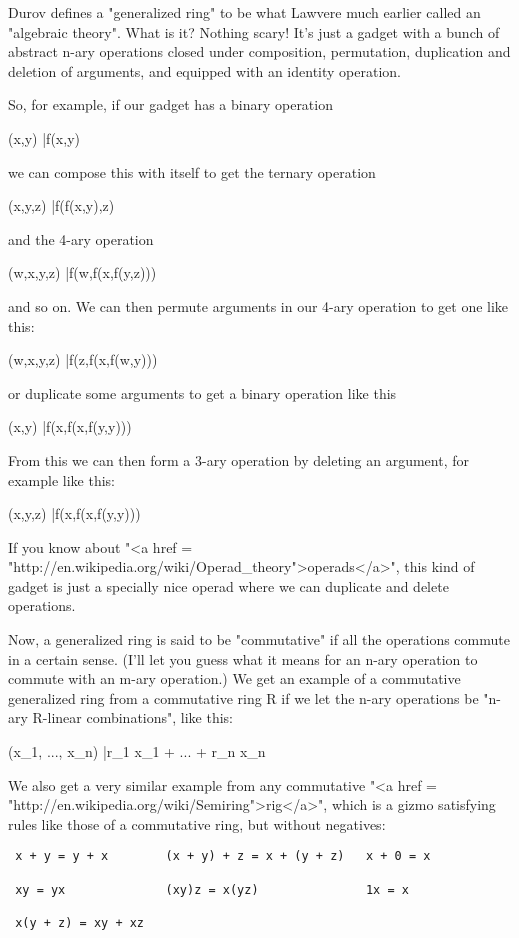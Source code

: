 Durov defines a "generalized ring" to be what Lawvere much
earlier called an "algebraic theory".  What is it?  Nothing
scary!  It's just a gadget with a bunch of abstract n-ary operations
closed under composition, permutation, duplication and deletion of
arguments, and equipped with an identity operation.

So, for example, if our gadget has a binary operation 

(x,y) |\to  f(x,y)

we can compose this with itself to get the ternary operation

(x,y,z) |\to  f(f(x,y),z)

and the 4-ary operation

(w,x,y,z) |\to  f(w,f(x,f(y,z)))

and so on.  We can then permute arguments in our 4-ary operation
to get one like this:

(w,x,y,z) |\to  f(z,f(x,f(w,y)))

or duplicate some arguments to get a binary operation like this

(x,y) |\to  f(x,f(x,f(y,y)))

From this we can then form a 3-ary operation by deleting an argument,
for example like this:

(x,y,z) |\to  f(x,f(x,f(y,y)))

If you know about 
"<a href = "http://en.wikipedia.org/wiki/Operad_theory">operads</a>",
this kind of gadget is just a specially 
nice operad where we can duplicate and delete operations.  
 
Now, a generalized ring is said to be "commutative" if all the 
operations commute in a certain sense.  (I'll let you guess what
it means for an n-ary operation to commute with an m-ary operation.)
We get an example of a commutative generalized ring from a commutative 
ring R if we let the n-ary operations be "n-ary R-linear 
combinations", like this:

(x_{1}, ..., x_{n}) |\to  r_{1} x_{1} + 
... + r_{n} x_{n}           

We also get a very similar example from any commutative "<a href =
"http://en.wikipedia.org/wiki/Semiring">rig</a>",
which is a gizmo satisfying rules like those of a commutative ring,
but without negatives:

\begin{verbatim}
 x + y = y + x        (x + y) + z = x + (y + z)   x + 0 = x

 xy = yx              (xy)z = x(yz)               1x = x

 x(y + z) = xy + xz 
\end{verbatim}
    

